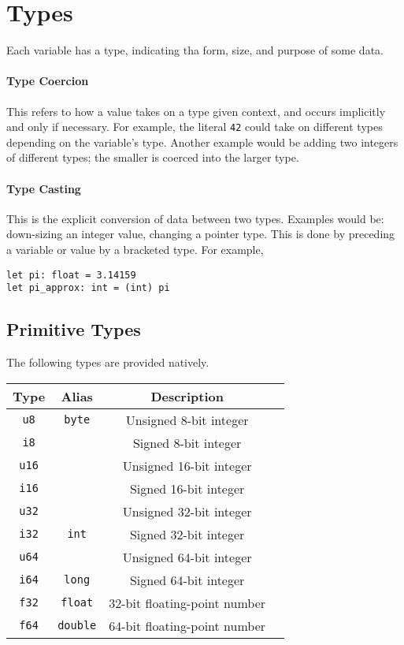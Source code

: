 \documentclass{article}
\begin{document}
\section{Types}

Each variable has a type, indicating tha form, size, and purpose of some data.

\paragraph*{Type Coercion}
This refers to how a value takes on a type given context, and occurs implicitly and only if necessary.
For example, the literal \texttt{42} could take on different types depending on the variable's type.
Another example would be adding two integers of different types; the smaller is coerced into the larger type.

\paragraph*{Type Casting}
This is the explicit conversion of data between two types.
Examples would be: down-sizing an integer value, changing a pointer type.
This is done by preceding a variable or value by a bracketed type.
For example,

\begin{lstlisting}[language=CustomLang]
let pi: float = 3.14159
let pi_approx: int = (int) pi
\end{lstlisting}

\subsection{Primitive Types}

The following types are provided natively.

\begin{tabular}{|c|c|c|l|}
    \hline
    \textbf{Type} & \textbf{Alias} & \textbf{Description} \\
    \hline
    \texttt{u8} & \texttt{byte} & Unsigned 8-bit integer \\
    \texttt{i8} & & Signed 8-bit integer \\
    \hline
    \texttt{u16} & & Unsigned 16-bit integer \\
    \texttt{i16} & & Signed 16-bit integer \\
    \hline
    \texttt{u32} & & Unsigned 32-bit integer \\
    \texttt{i32} & \texttt{int} & Signed 32-bit integer \\
    \hline
    \texttt{u64} & & Unsigned 64-bit integer \\
    \texttt{i64} & \texttt{long} & Signed 64-bit integer \\
    \hline
    \texttt{f32} & \texttt{float} & 32-bit floating-point number \\
    \texttt{f64} & \texttt{double} & 64-bit floating-point number \\
    \hline
\end{tabular}
\end{document}
